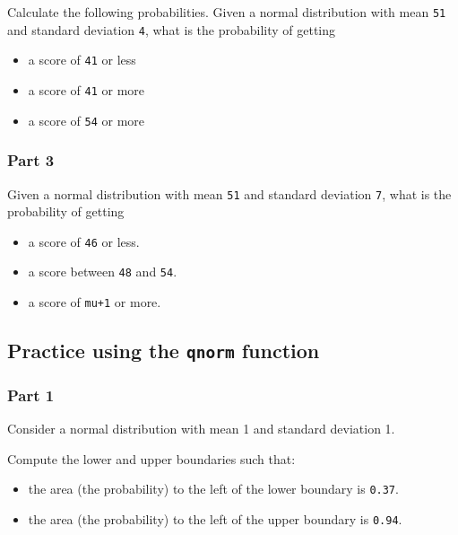 \documentclass[12pt,]{krantz}
\providecommand{\tightlist}{%
  \setlength{\itemsep}{0pt}\setlength{\parskip}{0pt}}
\begin{document}
Calculate the following probabilities.
Given a normal distribution with mean \texttt{51} and standard deviation \texttt{4}, what is the probability of getting

\begin{itemize}
\tightlist
\item
  a score of \texttt{41} or less
\item
  a score of \texttt{41} or more
\item
  a score of \texttt{54} or more
\end{itemize}

\hypertarget{sec:FoundationsexercisespnormPart3}{%
\subsubsection{Part 3}\label{sec:FoundationsexercisespnormPart3}}

Given a normal distribution with mean \texttt{51} and standard deviation \texttt{7}, what is the probability of getting

\begin{itemize}
\tightlist
\item
  a score of \texttt{46} or less.
\item
  a score between \texttt{48} and \texttt{54}.
\item
  a score of \texttt{mu+1} or more.
\end{itemize}

\hypertarget{sec:Foundationsexercisesqnorm}{%
\subsection{\texorpdfstring{Practice using the \texttt{qnorm} function}{Practice using the qnorm function}}\label{sec:Foundationsexercisesqnorm}}

\hypertarget{sec:FoundationsexercisesqnormPart1}{%
\subsubsection{Part 1}\label{sec:FoundationsexercisesqnormPart1}}

Consider a normal distribution with mean 1 and standard deviation 1.

Compute the lower and upper boundaries such that:

\begin{itemize}
\tightlist
\item
  the area (the probability) to the left of the lower boundary is \texttt{0.37}.
\item
  the area (the probability) to the left of the upper boundary is \texttt{0.94}.
\end{itemize}
\end{document}

